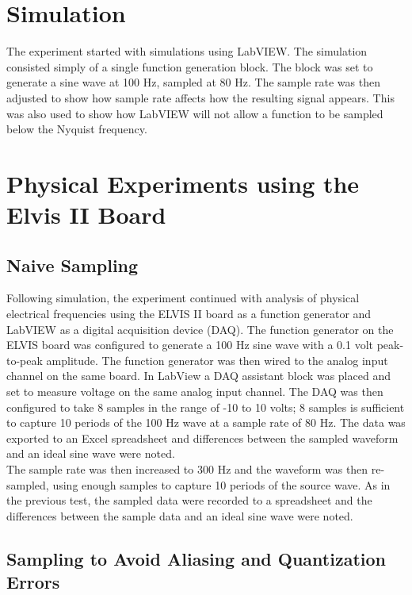 \documentclass[a4paper,titlepage]{article}
\begin{document}
	\section{Simulation}
	The experiment started with simulations using LabVIEW. The simulation consisted simply of a single function generation block. The block was set to generate a sine wave at 100 Hz, sampled at 80 Hz. The sample rate was then adjusted to show how sample rate affects how the resulting signal appears. This was also used to show how LabVIEW will not allow a function to be sampled below the Nyquist frequency.
	
	\section{Physical Experiments using the Elvis II Board}
	\subsection{Naive Sampling}
	Following simulation, the experiment continued with analysis of physical electrical frequencies using the ELVIS II board as a function generator and LabVIEW as a digital acquisition device (DAQ). The function generator on the ELVIS board was configured to generate a 100 Hz sine wave with a 0.1 volt peak-to-peak amplitude. The function generator was then wired to the analog input channel on the same board. In LabView a DAQ assistant block was placed and set to measure voltage on the same analog input channel. The DAQ was then configured to take 8 samples in the range of -10 to 10 volts; 8 samples is sufficient to capture 10 periods of the 100 Hz wave at a sample rate of 80 Hz. The data was exported to an Excel spreadsheet and differences between the sampled waveform and an ideal sine wave were noted.
	\\
	The sample rate was then increased to 300 Hz and the waveform was then re-sampled, using enough samples to capture 10 periods of the source wave. As in the previous test, the sampled data were recorded to a spreadsheet and the differences between the sample data and an ideal sine wave were noted.
	
	\subsection{Sampling to Avoid Aliasing and Quantization Errors}
\end{document}
